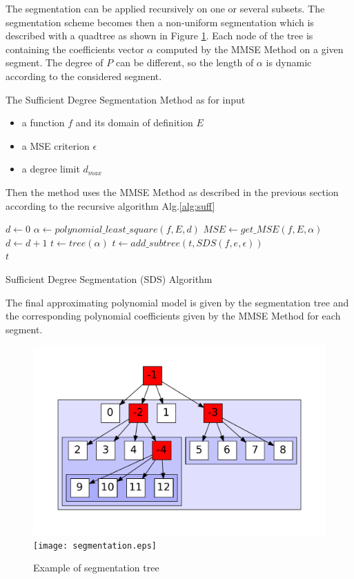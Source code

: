 \documentclass[fleqn,10pt]{SelfArx} %
\begin{document}
The segmentation can be applied recursively on one or several subsets. The segmentation scheme becomes then a non-uniform segmentation which is described with a quadtree as shown in Figure \ref{seg_tree}.
Each node of the tree is containing the coefficients vector $\alpha$ computed by the MMSE Method on a given segment. The degree of $P$ can be different, so the length of $\alpha$ is dynamic according to the considered segment.


The Sufficient Degree Segmentation Method as for input 
\begin{itemize}
    \item a function $f$ and its domain of definition $E$
    \item a MSE criterion $\epsilon$
    \item a degree limit $d_{max}$
\end{itemize}

Then the method uses the MMSE Method as described in the previous section according to the recursive algorithm Alg.\ref{alg:suff}
\begin{algorithm}
\begin{algorithmic}[1]
\State $d \gets 0$
\Do
	\State $\alpha \gets polynomial\_least\_square(f, E, d)$ 
	\State $MSE \gets get\_MSE(f, E, \alpha)$
    \State $d \gets d+1$
\State $t \gets tree(\alpha)$
		\State $t \gets add\_subtree(t, SDS(f, e, \epsilon))$
	\EndFor
\EndIf \\
\Return $t$
\EndFunction
\end{algorithmic}
\caption{Sufficient Degree Segmentation (SDS) Algorithm}
\label{alg:suff}
\end{algorithm}

The final approximating polynomial model is given by the segmentation tree and the corresponding polynomial coefficients given by the MMSE Method for each segment.
\begin{figure}
\centering
\includegraphics[width=\columnwidth]{graphics/seg_tree.pdf}
\texttt{[image: segmentation.eps]}
\caption{Example of segmentation tree}
\label{seg_tree}
\end{figure}
\end{document}

